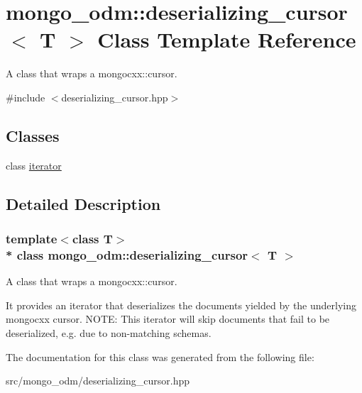 \hypertarget{classmongo__odm_1_1deserializing__cursor}{}\section{mongo\+\_\+odm\+:\+:deserializing\+\_\+cursor$<$ T $>$ Class Template Reference}
\label{classmongo__odm_1_1deserializing__cursor}


A class that wraps a mongocxx\+::cursor.  




{\ttfamily \#include $<$deserializing\+\_\+cursor.\+hpp$>$}

\subsection*{Classes}
\begin{DoxyCompactItemize}
\item 
class \hyperlink{classmongo__odm_1_1deserializing__cursor_1_1iterator}{iterator}
\end{DoxyCompactItemize}


\subsection{Detailed Description}
\subsubsection*{template$<$class T$>$\\*
class mongo\+\_\+odm\+::deserializing\+\_\+cursor$<$ T $>$}

A class that wraps a mongocxx\+::cursor. 

It provides an iterator that deserializes the documents yielded by the underlying mongocxx cursor. N\+O\+TE\+: This iterator will skip documents that fail to be deserialized, e.\+g. due to non-\/matching schemas. 

The documentation for this class was generated from the following file\+:\begin{DoxyCompactItemize}
\item 
src/mongo\+\_\+odm/deserializing\+\_\+cursor.\+hpp\end{DoxyCompactItemize}
